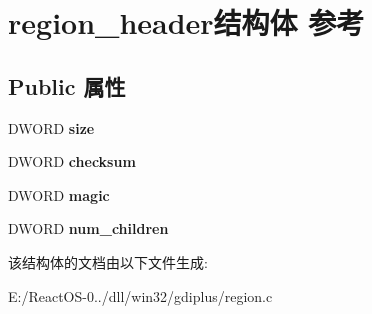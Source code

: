 \hypertarget{structregion__header}{}\section{region\+\_\+header结构体 参考}
\label{structregion__header}
\subsection*{Public 属性}
\begin{DoxyCompactItemize}
\item 
\mbox{\label{structregion__header_af4feef4a7e5b9632c428829756b1c2b7}} 
D\+W\+O\+RD {\bfseries size}
\item 
\mbox{\label{structregion__header_a0ea410416b4fa8e0da4d966b0bd96748}} 
D\+W\+O\+RD {\bfseries checksum}
\item 
\mbox{\label{structregion__header_af3dda89830de6ce857a745eb80bd867d}} 
D\+W\+O\+RD {\bfseries magic}
\item 
\mbox{\label{structregion__header_ac58cfb23e4b0008957ffe5bb6986adc9}} 
D\+W\+O\+RD {\bfseries num\+\_\+children}
\end{DoxyCompactItemize}


该结构体的文档由以下文件生成\+:\begin{DoxyCompactItemize}
\item 
E\+:/\+React\+O\+S-\/0../dll/win32/gdiplus/region.\+c\end{DoxyCompactItemize}
